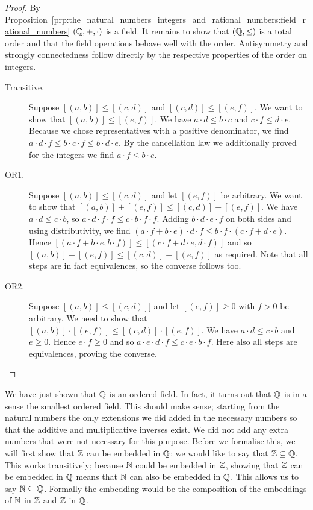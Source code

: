\documentclass[../main.tex]{subfiles}
\begin{document}
\begin{proof}
    By Proposition~\ref{prp:the_natural_numbers_integers_and_rational_numbers:field_rational_numbers} $(\mathbb{Q},+,\cdot)$ is a field. It remains to show that $(\mathbb{Q},\leq)$ is a total order and that the field operations behave well with the order. Antisymmetry and strongly connectedness follow directly by the respective properties of the order on integers. 
    \begin{description}
        \item[Transitive.] Suppose $[(a,b)]\leq[(c,d)]$ and $[(c,d)]\leq[(e,f)]$. We want to show that $[(a,b)]\leq[(e,f)]$. We have $a\cdot d\leq b\cdot c$ and $c\cdot f\leq d\cdot e$. Because we chose representatives with a positive denominator, we find $a\cdot d\cdot f\leq b\cdot c\cdot f\leq b\cdot d\cdot e$. By the cancellation law we additionally proved for the integers we find $a\cdot f\leq b\cdot e$.
        \item[OR1.] Suppose $[(a,b)]\leq [(c,d)]$ and let $[(e,f)]$ be arbitrary. We want to show that $[(a,b)]+[(e,f)]\leq[(c,d)]+[(e,f)]$. We have $a\cdot d\leq c\cdot b$, so $a\cdot d\cdot f\cdot f\leq c\cdot b\cdot f\cdot f$. Adding $b\cdot d\cdot e\cdot f$ on both sides and using distributivity, we find $(a\cdot f+b\cdot e)\cdot d\cdot f\leq b\cdot f\cdot(c\cdot f+d\cdot e)$. Hence $[(a\cdot f+b\cdot e,b\cdot f)]\leq[(c\cdot f+d\cdot e,d\cdot f)]$ and so $[(a,b)]+[(e,f)]\leq [(c,d)]+[(e,f)]$ as required. Note that all steps are in fact equivalences, so the converse follows too.
        \item[OR2.] Suppose $[(a,b)]\leq[(c,d)]]$ and let $[(e,f)]\geq0$ with $f>0$ be arbitrary. We need to show that $[(a,b)]\cdot[(e,f)]\leq[(c,d)]\cdot[(e,f)]$. We have $a\cdot d\leq c\cdot b$ and $e\geq0$. Hence $e\cdot f\geq0$ and so $a\cdot e\cdot d\cdot f\leq c\cdot e\cdot b\cdot f$. Here also all steps are equivalences, proving the converse.
    \end{description}
\end{proof}
We have just shown that $\mathbb{Q}$ is an ordered field. In fact, it turns out that $\mathbb{Q}$ is in a sense the smallest ordered field. This should make sense; starting from the natural numbers the only extensions we did added in the necessary numbers so that the additive and multiplicative inverses exist. We did not add any extra numbers that were not necessary for this purpose. Before we formalise this, we will first show that $\mathbb{Z}$ can be embedded in $\mathbb{Q}$; we would like to say that $\mathbb{Z}\subseteq\mathbb{Q}$. This works transitively; because $\mathbb{N}$ could be embedded in $\mathbb{Z}$, showing that $\mathbb{Z}$ can be embedded in $\mathbb{Q}$ means that $\mathbb{N}$ can also be embedded in $\mathbb{Q}$. This allows us to say $\mathbb{N}\subseteq\mathbb{Q}$. Formally the embedding would be the composition of the embeddings of $\mathbb{N}$ in $\mathbb{Z}$ and $\mathbb{Z}$ in $\mathbb{Q}$.
\end{document}
